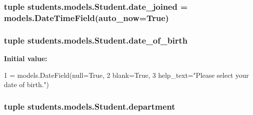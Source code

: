 \hypertarget{classstudents_1_1models_1_1_student_a904985debef148d1871397fbdd756c91}{
\subsubsection[{date\-\_\-joined}]{\setlength{\rightskip}{0pt plus 5cm}tuple students.\-models.\-Student.\-date\-\_\-joined = models.\-Date\-Time\-Field(auto\-\_\-now=True)\hspace{0.3cm}{\ttfamily [static]}}}\label{classstudents_1_1models_1_1_student_a904985debef148d1871397fbdd756c91}
\hypertarget{classstudents_1_1models_1_1_student_af7f5dc2a714b4a00ceac864f96a5126c}{
\subsubsection[{date\-\_\-of\-\_\-birth}]{\setlength{\rightskip}{0pt plus 5cm}tuple students.\-models.\-Student.\-date\-\_\-of\-\_\-birth\hspace{0.3cm}{\ttfamily [static]}}}\label{classstudents_1_1models_1_1_student_af7f5dc2a714b4a00ceac864f96a5126c}
{\bfseries Initial value\-:}
\begin{DoxyCode}
1 = models.DateField(null=\textcolor{keyword}{True},
2                                      blank=\textcolor{keyword}{True},
3                                      help\_text=\textcolor{stringliteral}{"Please select your date of birth."})
\end{DoxyCode}
\hypertarget{classstudents_1_1models_1_1_student_ab9b3060609019e2bc54a43d2e09c0cbd}{
\subsubsection[{department}]{\setlength{\rightskip}{0pt plus 5cm}tuple students.\-models.\-Student.\-department\hspace{0.3cm}{\ttfamily [static]}}}\label{classstudents_1_1models_1_1_student_ab9b3060609019e2bc54a43d2e09c0cbd}
